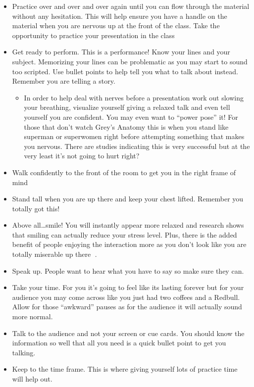 \documentclass[
]{book}
\providecommand{\tightlist}{%
  \setlength{\itemsep}{0pt}\setlength{\parskip}{0pt}}
\begin{document}
\begin{itemize}
\tightlist
\item
  Practice over and over and over again until you can flow through the material without any hesitation. This will help ensure you have a handle on the material when you are nervous up at the front of the class. Take the opportunity to practice your presentation in the class
\item
  Get ready to perform. This is a performance! Know your lines and your subject. Memorizing your lines can be problematic as you may start to sound too scripted. Use bullet points to help tell you what to talk about instead. Remember you are telling a story.

  \begin{itemize}
  \tightlist
  \item
    In order to help deal with nerves before a presentation work out slowing your breathing, visualize yourself giving a relaxed talk and even tell yourself you are confident. You may even want to ``power pose'' it! For those that don't watch Grey's Anatomy this is when you stand like superman or superwomen right before attempting something that makes you nervous. There are studies indicating this is very successful but at the very least it's not going to hurt right?
  \end{itemize}
\item
  Walk confidently to the front of the room to get you in the right frame of mind
\item
  Stand tall when you are up there and keep your chest lifted. Remember you totally got this!
\item
  Above all\ldots smile! You will instantly appear more relaxed and research shows that smiling can actually reduce your stress level. Plus, there is the added benefit of people enjoying the interaction more as you don't look like you are totally miserable up there .
\item
  Speak up. People want to hear what you have to say so make sure they can.
\item
  Take your time. For you it's going to feel like its lasting forever but for your audience you may come across like you just had two coffees and a Redbull. Allow for those ``awkward'' pauses as for the audience it will actually sound more normal.
\item
  Talk to the audience and not your screen or cue cards. You should know the information so well that all you need is a quick bullet point to get you talking.
\item
  Keep to the time frame. This is where giving yourself lots of practice time will help out.
\end{itemize}
\end{document}
